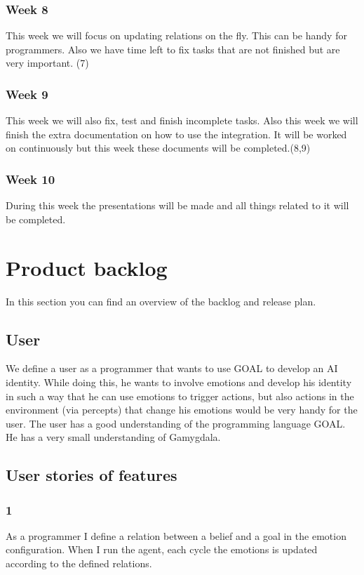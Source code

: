 \documentclass[]{article}
\begin{document}
\subsubsection*{Week 8}
This week we will focus on updating relations on the fly. This can be handy for programmers. Also we have time left to fix tasks that are not finished but are very important. (7)

\subsubsection*{Week 9}
This week we will also fix, test and finish incomplete tasks. Also this week we will finish the extra documentation on how to use the integration. It will be worked on continuously but this week these documents will be completed.(8,9)

\subsubsection*{Week 10}
During this week the presentations will be made and all things related to it will be completed.

\section{Product backlog}
In this section you can find an overview of the backlog and release plan.
\subsection{User}
We define a user as a programmer that wants to use GOAL to develop an AI identity. While doing this, he wants to involve emotions and develop his identity in such a way that he can use emotions to trigger actions, but also actions in the environment (via percepts) that change his emotions would be very handy for the user. The user has a good understanding of the programming language GOAL. He has a very small understanding of Gamygdala.
\subsection{User stories of features}
\subsubsection*{1}
As a programmer I define a relation between a belief and a goal in the emotion configuration. When I run the agent, each cycle the emotions is updated according to the defined relations. 
\end{document}
